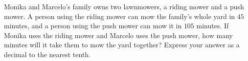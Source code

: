 Monika and Marcelo's family owns two lawnmowers, a riding mower and a push mower. A person using the riding mower can mow the family's whole yard in $45$ minutes, and a person using the push mower can mow it in $105$ minutes. If Monika uses the riding mower and Marcelo uses the push mower, how many minutes will it take them to mow the yard together? Express your answer as a decimal to the nearest tenth.
